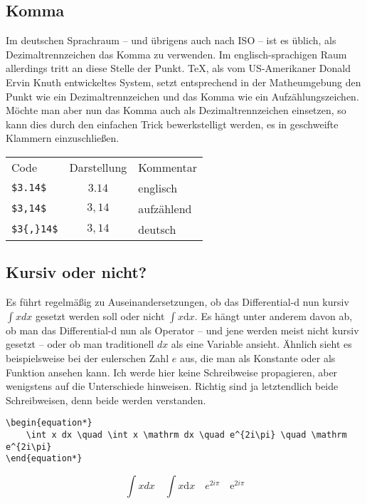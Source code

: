 \subsection{Komma}
Im deutschen Sprachraum -- und übrigens auch nach ISO -- ist es üblich, als Dezimaltrennzeichen das Komma zu verwenden. Im englisch-sprachigen Raum allerdings tritt an diese Stelle der Punkt. TeX, als vom US-Amerikaner Donald Ervin Knuth entwickeltes System, setzt entsprechend in der Matheumgebung den Punkt wie ein Dezimaltrennzeichen und das Komma wie ein Aufzählungszeichen. Möchte man aber nun das Komma auch als Dezimaltrennzeichen einsetzen, so kann dies durch den einfachen Trick bewerkstelligt werden, es in geschweifte Klammern einzuschließen.

\begin{tabular}{lcl}
Code            & Darstellung & Kommentar\\
\verb|$3.14$|   & $3.14$      & englisch\\
\verb|$3,14$|   & $3,14$      & aufzählend\\
\verb|$3{,}14$| & $3{,}14$    & deutsch
\end{tabular}

\subsection{Kursiv oder nicht?}
Es führt regelmäßig zu Auseinandersetzungen, ob das Differential-d nun kursiv $\int xdx$ gesetzt werden soll oder nicht $\int x\mathrm dx$. Es hängt unter anderem davon ab, ob man das Differential-d nun als Operator -- und jene werden meist nicht kursiv gesetzt -- oder ob man traditionell $dx$ als eine Variable ansieht. Ähnlich sieht es beispielsweise bei der eulerschen Zahl $e$ aus, die man als Konstante oder als Funktion ansehen kann. Ich werde hier keine Schreibweise propagieren, aber wenigstens auf die Unterschiede hinweisen. Richtig sind ja letztendlich beide Schreibweisen, denn beide werden verstanden.
\begin{lstlisting}
\begin{equation*}
	\int x dx \quad \int x \mathrm dx \quad e^{2i\pi} \quad \mathrm e^{2i\pi}
\end{equation*}
\end{lstlisting}

\begin{equation*}
	\int x dx \quad \int x \mathrm dx \quad e^{2i\pi} \quad \mathrm e^{2i\pi}
\end{equation*}

